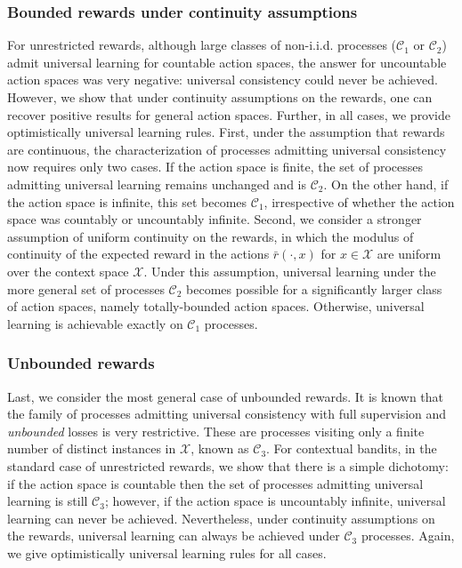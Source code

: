 \documentclass[aos]{imsart}
\theoremstyle{plain}
\theoremstyle{remark}
\newcommand{\Ccal}{\mathcal{C}}
\newcommand{\Xcal}{\mathcal{X}}
\newcommand{\1}{\mathbbm{1}}%
\begin{document}
\subsubsection{Bounded rewards under continuity assumptions}
For unrestricted rewards, although large classes of non-i.i.d. processes ($\Ccal_1$ or $\Ccal_2$) admit universal learning for countable action spaces, the answer for uncountable action spaces was very negative: universal consistency could never be achieved. However, we show that under continuity assumptions on the rewards, one can recover positive results for general action spaces. Further, in all cases, we provide optimistically universal learning rules. First, under the assumption that rewards are continuous, the characterization of processes admitting universal consistency now requires only two cases. If the action space is finite, the set of processes admitting universal learning remains unchanged and is $\Ccal_2$. On the other hand, if the action space is infinite, this set becomes $\Ccal_1$, irrespective of whether the action space was countably or uncountably infinite. Second, we consider a stronger assumption of uniform continuity on the rewards, in which the modulus of continuity of the expected reward in the actions $\bar r(\cdot,x)$ for $x\in \Xcal$ are uniform over the context space $\Xcal$. Under this assumption, universal learning under the more general set of processes $\Ccal_2$ becomes possible for a significantly larger class of action spaces, namely totally-bounded action spaces. Otherwise, universal learning is achievable exactly on $\Ccal_1$ processes.


\subsubsection{Unbounded rewards}
Last, we consider the most general case of unbounded rewards. It is known that the family of processes admitting universal consistency with full supervision and \emph{unbounded} losses is very restrictive. These are processes visiting only a finite number of distinct instances in $\Xcal$, known as $\Ccal_3$. For contextual bandits, in the standard case of unrestricted rewards, we show that there is a simple dichotomy: if the action space is countable then the set of processes admitting universal learning is still $\Ccal_3$; however, if the action space is uncountably infinite, universal learning can never be achieved. Nevertheless, under continuity assumptions on the rewards, universal learning can always be achieved under $\Ccal_3$ processes. Again, we give optimistically universal learning rules for all cases.
\end{document}
